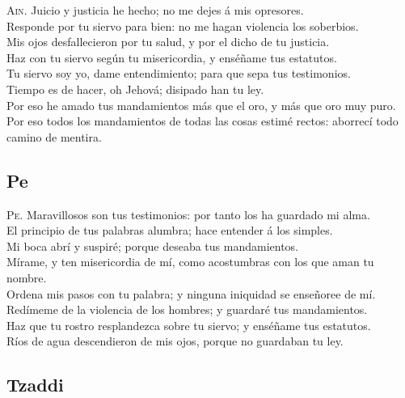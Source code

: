  \textsc{Ain}. Juicio y justicia he hecho; no me dejes á
mis opresores.\\
 Responde por tu siervo para bien: no me hagan violencia
los soberbios.\\
 Mis ojos desfallecieron por tu salud, y por el dicho de
tu justicia.\\
 Haz con tu siervo según tu misericordia, y enséñame tus
estatutos.\\
 Tu siervo soy yo, dame entendimiento; para que sepa tus
testimonios.\\
 Tiempo es de hacer, oh Jehová; disipado han tu ley.\\
 Por eso he amado tus mandamientos más que el oro, y más
que oro muy puro.\\
 Por eso todos los mandamientos de todas las cosas
estimé rectos: aborrecí todo camino de mentira.

\hypertarget{pe}{%
\subsection{Pe}\label{pe}}

 \textsc{Pe}. Maravillosos son tus testimonios: por
tanto los ha guardado mi alma.\\
 El principio de tus palabras alumbra; hace entender á
los simples.\\
 Mi boca abrí y suspiré; porque deseaba tus
mandamientos.\\
 Mírame, y ten misericordia de mí, como acostumbras con
los que aman tu nombre.\\
 Ordena mis pasos con tu palabra; y ninguna iniquidad se
enseñoree de mí.\\
 Redímeme de la violencia de los hombres; y guardaré tus
mandamientos.\\
 Haz que tu rostro resplandezca sobre tu siervo; y
enséñame tus estatutos.\\
 Ríos de agua descendieron de mis ojos, porque no
guardaban tu ley.

\hypertarget{tzaddi}{%
\subsection{Tzaddi}\label{tzaddi}}

